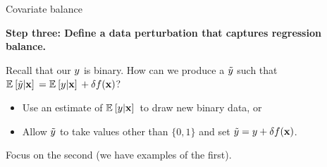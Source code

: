 
\begin{frame}[t]{Covariate balance}


\textbf{Step three: Define a data perturbation that captures regression balance.}

Recall that our $y$ is binary.  How can we produce a $\tilde{y}$ such that
$\mathbb{E}_{}\left[ \tilde{y} \vert \mathbf{x}\right]\, = \mathbb{E}_{}\left[ y \vert \mathbf{x}\right]\, + \delta f(\mathbf{x})$?
%
\begin{itemize}
    \item Use an estimate of $\mathbb{E}_{}\left[ y \vert \mathbf{x}\right]\,$ to draw new binary data, or
    \item Allow $\tilde{y}$ to take values other than $\{0,1\}$ and set
        $\tilde{y} = y + \delta f(\mathbf{x})$.
\end{itemize}
%
Focus on the second (we have examples of the first).

\end{frame}




